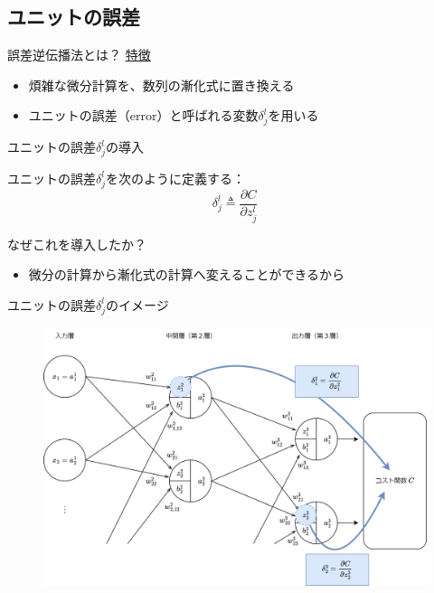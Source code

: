 \documentclass[dvipdfmx,aspectratio=169]{beamer}
\begin{document}
	\subsection{ユニットの誤差}
	\begin{frame}{誤差逆伝播法とは？}
		\underline{特徴}
		\begin{itemize}
			\item 煩雑な微分計算を、\alert{数列の漸化式}に置き換える
			\item \alert{ユニットの誤差}（error）と呼ばれる変数$ \delta^l_j $を用いる
		\end{itemize}
	\end{frame}
	\begin{frame}{ユニットの誤差$ \delta^l_j $の導入}
		\begin{screen}
			\alert{ユニットの誤差}$ \delta^l_j $を次のように定義する：
			\begin{equation}\label{eq:unit-error}
				\delta^l_j \triangleq \dfrac{\partial C}{\partial z^l_j}
			\end{equation}
		\end{screen}
		なぜこれを導入したか？
		\begin{itemize}
			\item 微分の計算から漸化式の計算へ変えることができるから
		\end{itemize}		
	\end{frame}
	\begin{frame}{ユニットの誤差$ \delta^l_j $のイメージ}
		\begin{figure}
			\centering
			\includegraphics[width=0.7\linewidth]{img/image-of-unit-error}
		\end{figure}
	\end{frame}
\end{document}
